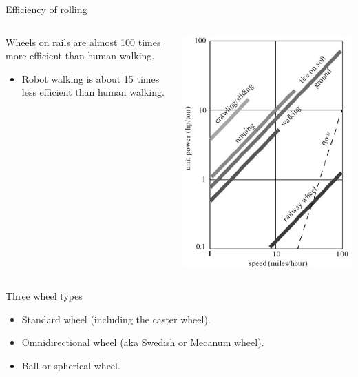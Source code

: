 \documentclass[compress]{beamer}
\begin{document}
\begin{frame}{Efficiency of rolling}
    \begin{columns}
        \begin{column}{0.5\linewidth}
            Wheels on rails are almost 100 times more efficient than human walking.

            \begin{itemize}
                \item Robot walking is about 15 times less efficient than human walking.
            \end{itemize}

        \end{column}
        \begin{column}{0.5\linewidth}

            \begin{center}
                \includegraphics[width=0.8\linewidth]{rolling}
            \end{center}
        \end{column}
    \end{columns}
\end{frame}

\begin{frame}{Three wheel types}

\begin{itemize}
    \item Standard wheel (including the caster wheel).
    \item Omnidirectional wheel (aka \href{http://en.wikipedia.org/wiki/Mecanum_wheel}{Swedish or Mecanum wheel}).
    \item Ball or spherical wheel.
\end{itemize}

\end{frame}
\end{document}
